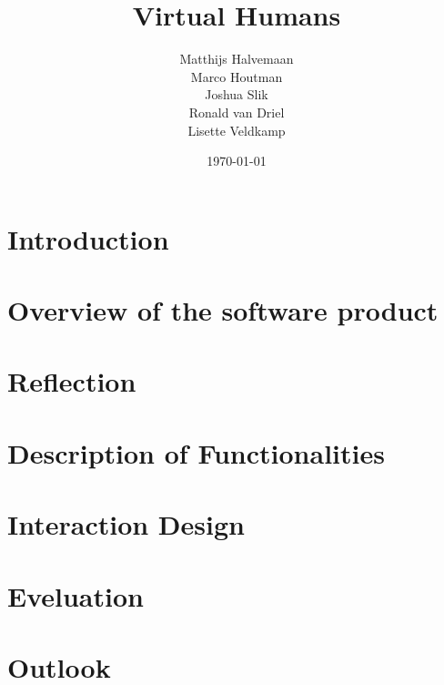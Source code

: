 \documentclass{article}
\begin{document}
\title{Virtual Humans}
\author{Matthijs Halvemaan \\
        Marco Houtman \\
        Joshua Slik \\
        Ronald van Driel \\
        Lisette Veldkamp}

\date{\today}

\maketitle

\tableofcontents

\section{Introduction}

\section{Overview of the software product}

\section{Reflection}

\section{Description of Functionalities}

\section{Interaction Design}

\section{Eveluation}

\section{Outlook}
\end{document}
